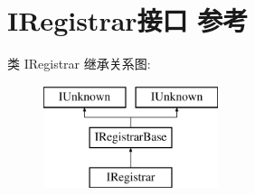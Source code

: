 \hypertarget{interface_i_registrar}{}\section{I\+Registrar接口 参考}
\label{interface_i_registrar}
类 I\+Registrar 继承关系图\+:\begin{figure}[H]
\begin{center}
\leavevmode
\includegraphics[height=3.000000cm]{interface_i_registrar}
\end{center}
\end{figure}
